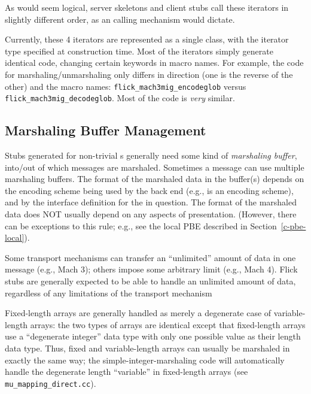 As would seem logical, server skeletons and client stubs call these iterators
in slightly different order, as an \RPC{} calling mechanism would dictate.

Currently, these 4 iterators are represented as a single class, with the
iterator type specified at construction time.  Most of the iterators simply
generate identical code, changing certain keywords in macro names.  For
example, the code for marshaling/unmarshaling only differs in direction (one is
the reverse of the other) and the macro names:
\texttt{flick\_mach3mig\_encodeglob} versus
\texttt{flick\_mach3mig\_decodeglob}.  Most of the code is \emph{very} similar.


\subsection{Marshaling Buffer Management}

Stubs generated for non-trivial \RPC{}s generally need some kind of
\emph{marshaling buffer}, into/out of which messages are marshaled.  Sometimes
a message can use multiple marshaling buffers.  The format of the marshaled
data in the buffer(s) depends on the encoding scheme being used by the back end
(e.g., \XDR{} is an encoding scheme), and by the \MINT{} interface definition for the
\RPC{} in question.  The format of the marshaled data does NOT usually depend on
any aspects of presentation.  (However, there can be exceptions to this rule;
e.g., see the local PBE described in Section~\ref{c-pbe-local}).

Some transport mechanisms can transfer an ``unlimited'' amount of data in one
message (e.g., Mach 3); others impose some arbitrary limit (e.g., Mach 4).
Flick stubs are generally expected to be able to handle an unlimited amount of
data, regardless of any limitations of the transport mechanism

Fixed-length arrays are generally handled as merely a degenerate case of
variable-length arrays: the two types of arrays are identical except that
fixed-length arrays use a ``degenerate integer'' data type with only one
possible value as their length data type.  Thus, fixed and variable-length
arrays can usually be marshaled in exactly the same way; the
simple-integer-marshaling code will automatically handle the degenerate length
``variable'' in fixed-length arrays (see \texttt{mu\_mapping\_direct.cc}).

